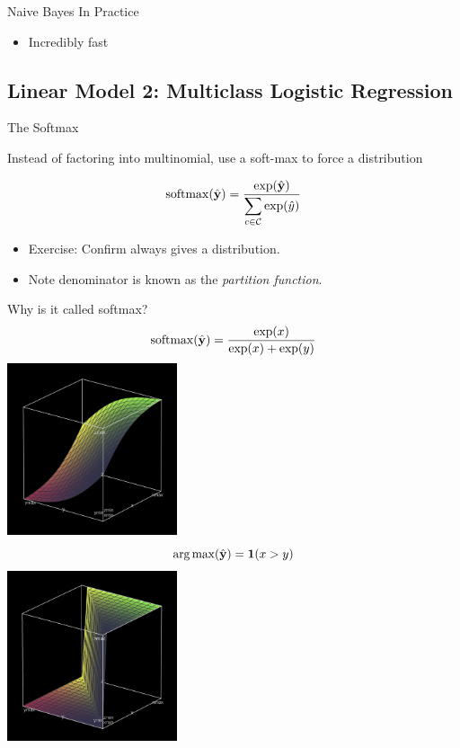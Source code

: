 \documentclass{beamer}
\begin{document}
\begin{frame}{Naive Bayes In Practice}
  
  \begin{itemize}
  \item Incredibly fast
  \end{itemize}
\end{frame}

\subsection{Linear Model 2: Multiclass Logistic Regression}

\begin{frame}{The Softmax}

  Instead of factoring into multinomial, use a soft-max to force a distribution
  
  \[\softmax(\hat{\boldy}) = \frac{\exp(\hat{\boldy})}{\displaystyle \sum_{c \in \mcC} \exp(\hat{y})}  \]

  \begin{itemize}
  \item Exercise: Confirm always gives a distribution.

  \item Note denominator is known as the \textit{partition function}.
  \end{itemize}

\end{frame}


\begin{frame}{Why is it called softmax?}
  \[\softmax(\hat{\boldy}) = \frac{\exp(x)}{\displaystyle  \exp(x) + \exp(y)}  \]
  \includegraphics[width=5cm]{softmax}
  \[\argmax(\hat{\boldy}) = \indicator(x > y) \]
  \includegraphics[width=5cm]{argmax}
\end{frame}
\end{document}
